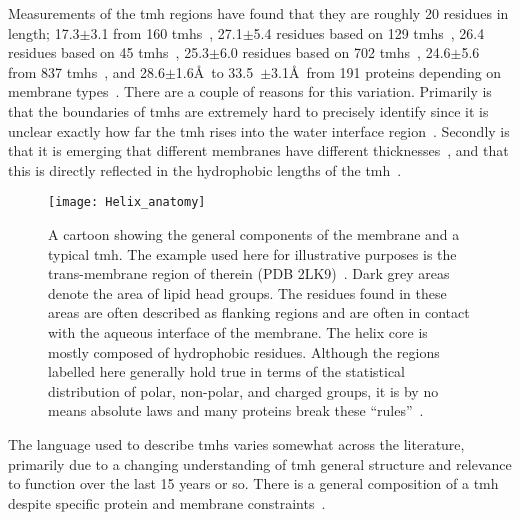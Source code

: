 Measurements of the \gls{tmh} regions have found that they are roughly 20 residues in length; 17.3$\pm$3.1 from 160 \gls{tmh}s~\cite{Hildebrand2004}, 27.1$\pm$5.4 residues based on 129 \gls{tmh}s~\cite{Ulmschneider2001}, 26.4 residues based on 45 \gls{tmh}s~\cite{Bowie1997}, 25.3$\pm$6.0 residues based on 702 \gls{tmh}s~\cite{Cuthbertson2005}, 24.6$\pm$5.6 from 837 \gls{tmh}s~\cite{Baeza-Delgado2013}, and 28.6$\pm$1.6\AA~to 33.5~$\pm$3.1\AA~from 191 proteins depending on membrane types~\cite{Pogozheva2013}. There are a couple of reasons for this variation. Primarily is that the boundaries of \gls{tmh}s are extremely hard to precisely identify since it is unclear exactly how far the \gls{tmh} rises into the water interface region~\cite{VonHeijne2006}. Secondly is that it is emerging that different membranes have different thicknesses~\cite{VanMeer2008}, and that this is directly reflected in the hydrophobic lengths of the \gls{tmh}~\cite{Sharpe2010, Pogozheva2013}.
\begin{figure}[!ht]
\centering
\texttt{[image: Helix\_anatomy]}
\caption{A cartoon showing the general components of the membrane and a typical \gls{tmh}. The example used here for illustrative purposes is the trans-membrane region of therein (PDB 2LK9)~\cite{Skasko2012}. Dark grey areas denote the area of lipid head groups. The residues found in these areas are often described as flanking regions and are often in contact with the aqueous interface of the membrane. The helix core is mostly composed of hydrophobic residues. Although the regions labelled here generally hold true in terms of the statistical distribution of polar, non-polar, and charged groups, it is by no means absolute laws and many proteins break these ``rules''~\cite{Sharpe2010, Baeza-Delgado2013, Pogozheva2013}. }
\label{fig:helixcartoon1}
\end{figure}




The language used to describe \gls{tmh}s varies somewhat across the literature, primarily due to a changing understanding of \gls{tmh} general structure and relevance to function over the last 15 years or so. There is a general composition of a \gls{tmh} despite specific protein and membrane constraints~\cite{Sharpe2010}.

